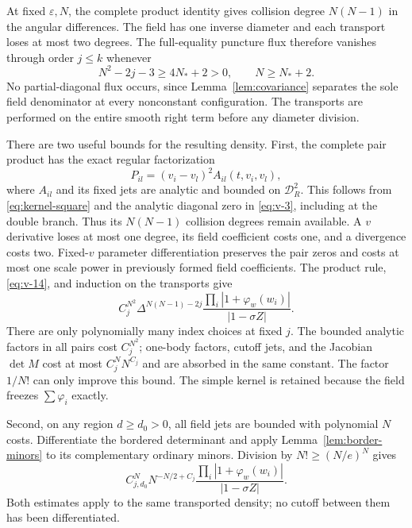 \documentclass[11pt]{article}
\numberwithin{equation}{section}
\theoremstyle{remark}\newtheorem{remark}[theorem]{Remark}
\begin{document}
At fixed $\varepsilon,N$, the complete product identity gives
collision degree $N(N-1)$ in the angular differences.
The field has one inverse diameter and each transport loses at most
two degrees. The full-equality puncture flux therefore vanishes
through order $j\le k$ whenever
\begin{equation}\label{eq:v-18}
 N^2-2j-3\ge4N_*+2>0,\qquad N\ge N_*+2.
\end{equation}
No partial-diagonal flux occurs, since Lemma~\ref{lem:covariance}
separates the sole field denominator at every nonconstant configuration. The transports are performed on the
entire smooth right term before any diameter division.

There are two useful bounds for the resulting density. First,
the complete pair product has the exact regular factorization
\[
 P_{il}=(v_i-v_l)^2A_{il}(t,v_i,v_l),
\]
where $A_{il}$ and its fixed jets are analytic and bounded on
$\mathcal D_R^2$. This follows from \eqref{eq:kernel-square}
and the analytic diagonal zero in \eqref{eq:v-3}, including at
the double branch. Thus its $N(N-1)$ collision degrees remain
available. A $v$ derivative loses at most one degree, its field
coefficient costs one, and a divergence costs two. Fixed-$v$
parameter differentiation preserves the pair zeros and costs at most
one scale power in previously formed field coefficients. The product
rule, \eqref{eq:v-14}, and induction on the transports give
\begin{equation}\label{eq:full-product-density}
 C_j^{N^2}\Delta^{N(N-1)-2j}
       \frac{\prod_i|1+\varphi_w(w_i)|}{|1-\sigma Z|}.
\end{equation}
There are only polynomially many index choices at fixed $j$.
The bounded analytic factors in all pairs cost $C_j^{N^2}$;
one-body factors, cutoff jets, and the Jacobian $\det M$ cost
at most $C_j^NN^{C_j}$ and are absorbed in the same constant.
The factor $1/N!$ can only improve this bound. The simple kernel
is retained because the field freezes $\sum\varphi_i$ exactly.

Second, on any region $d\ge d_0>0$, all field jets are bounded
with polynomial $N$ costs. Differentiate the bordered determinant
and apply Lemma~\ref{lem:border-minors} to its complementary
ordinary minors. Division by $N!\ge(N/e)^N$ gives
\begin{equation}\label{eq:far-density}
 C_{j,d_0}^N N^{-N/2+C_j}
       \frac{\prod_i|1+\varphi_w(w_i)|}{|1-\sigma Z|}.
\end{equation}
Both estimates apply to the same transported density; no cutoff
between them has been differentiated.
\end{document}
